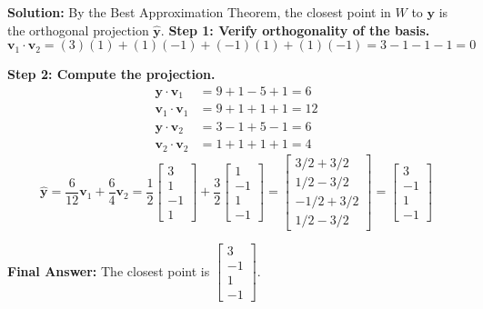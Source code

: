 \documentclass[11pt, letterpaper]{article}
\theoremstyle{definition}
\theoremstyle{remark}
\begin{document}
\textbf{Solution:}
By the Best Approximation Theorem, the closest point in $W$ to $\mathbf{y}$ is the orthogonal projection $\hat{\mathbf{y}}$.
\textbf{Step 1: Verify orthogonality of the basis.}
\[ \mathbf{v}_1 \cdot \mathbf{v}_2 = (3)(1) + (1)(-1) + (-1)(1) + (1)(-1) = 3 - 1 - 1 - 1 = 0 \]

\textbf{Step 2: Compute the projection.}
\begin{align*}
    \mathbf{y} \cdot \mathbf{v}_1 &= 9 + 1 - 5 + 1 = 6 \\
    \mathbf{v}_1 \cdot \mathbf{v}_1 &= 9 + 1 + 1 + 1 = 12 \\
    \mathbf{y} \cdot \mathbf{v}_2 &= 3 - 1 + 5 - 1 = 6 \\
    \mathbf{v}_2 \cdot \mathbf{v}_2 &= 1 + 1 + 1 + 1 = 4
\end{align*}
\[ \hat{\mathbf{y}} = \frac{6}{12}\mathbf{v}_1 + \frac{6}{4}\mathbf{v}_2 = \frac{1}{2} \begin{bmatrix} 3 \\ 1 \\ -1 \\ 1 \end{bmatrix} + \frac{3}{2} \begin{bmatrix} 1 \\ -1 \\ 1 \\ -1 \end{bmatrix} = \begin{bmatrix} 3/2 + 3/2 \\ 1/2 - 3/2 \\ -1/2 + 3/2 \\ 1/2 - 3/2 \end{bmatrix} = \begin{bmatrix} 3 \\ -1 \\ 1 \\ -1 \end{bmatrix} \]

\textbf{Final Answer:} The closest point is $\begin{bmatrix} 3 \\ -1 \\ 1 \\ -1 \end{bmatrix}$.

\vspace{1em}
\end{document}

